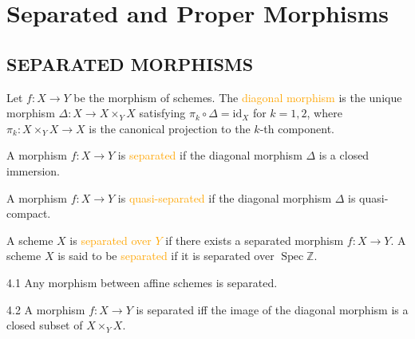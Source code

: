 \chapter{Separated and Proper Morphisms}

\section*{SEPARATED MORPHISMS}

\begin{definition}
	Let $f:X\rightarrow Y$ be the morphism of schemes. The \textcolor{orange}{diagonal morphism} is the unique morphism $\Delta:X\rightarrow X\times_YX$ satisfying $\pi_k\circ\Delta=\mathrm{id}_X$ for $k=1,2$, where $\pi_k:X\times_YX\rightarrow X$ is the canonical projection to the $k$-th component.
\end{definition}

\begin{definition}
	A morphism $f:X\rightarrow Y$ is \textcolor{orange}{separated} if the diagonal morphism $\Delta$ is a closed immersion.
	
	A morphism $f:X\rightarrow Y$ is \textcolor{orange}{quasi-separated} if the diagonal morphism $\Delta$ is quasi-compact. 
\end{definition}
	
\begin{definition}
	A scheme $X$ is \textcolor{orange}{separated over $Y$} if there exists a separated morphism $f:X\rightarrow Y$. A scheme $X$ is said to be \textcolor{orange}{separated} if it is separated over $\operatorname{Spec}\mathbb{Z}$.
\end{definition}

\begin{proposition}{4.1}
	Any morphism between affine schemes is separated.
\end{proposition}

\begin{corollary}{4.2}
	A morphism $f:X\rightarrow Y$ is separated iff the image of the diagonal morphism is a closed subset of $X\times_YX$.
\end{corollary}

